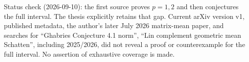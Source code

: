 \documentclass[11pt,a4paper]{article}
\begin{document}
Status check (2026-09-10): the first source proves \(p=1,2\) and then
conjectures the full interval. The thesis explicitly retains that gap.
Current arXiv version v1, published metadata, the author's later July
2026 matrix-mean paper, and searches for ``Ghabries Conjecture 4.1
norm'', ``Lin complement geometric mean Schatten'', including 2025/2026,
did not reveal a proof or counterexample for the full interval. No
assertion of exhaustive coverage is made.
\end{document}
